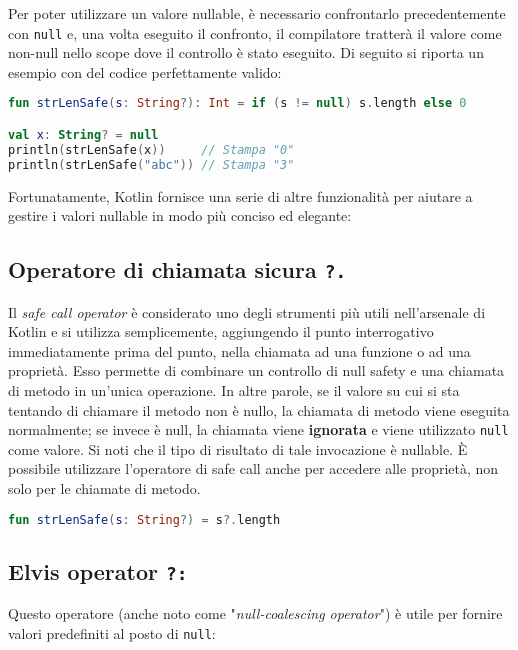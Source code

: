 Per poter utilizzare un valore nullable, è necessario confrontarlo precedentemente con \texttt{null} e, una volta eseguito il confronto, il compilatore tratterà il valore come non-null nello scope dove il controllo è stato eseguito. Di seguito si riporta un esempio con del codice perfettamente valido:\\

\begin{lstlisting}[caption={Aggirare i valori \texttt{null} grazie alla nullability}, captionpos=b, label={lst:exampleNullKtElse}, language=Kotlin]
fun strLenSafe(s: String?): Int = if (s != null) s.length else 0

val x: String? = null
println(strLenSafe(x))     // Stampa "0"
println(strLenSafe("abc")) // Stampa "3"
\end{lstlisting}

Fortunatamente, Kotlin fornisce una serie di altre funzionalità per aiutare a gestire i valori nullable in modo più conciso ed elegante:\\

\subsection{Operatore di chiamata sicura {\bfseries \texttt{?.}}}
Il {\em safe call operator} è considerato uno degli strumenti più utili nell'arsenale di Kotlin e si utilizza semplicemente, aggiungendo il punto interrogativo immediatamente prima del punto, nella chiamata ad una funzione o ad una proprietà. Esso permette di combinare un controllo di null safety e una chiamata di metodo in un'unica operazione. In altre parole, se il valore su cui si sta tentando di chiamare il metodo non è nullo, la chiamata di metodo viene eseguita normalmente; se invece è null, la chiamata viene {\bfseries ignorata} e viene utilizzato \texttt{null} come valore. Si noti che il tipo di risultato di tale invocazione è nullable. È possibile utilizzare l'operatore di safe call anche per accedere alle proprietà, non solo per le chiamate di metodo.\\

\begin{lstlisting}[caption={Utilizzo di safe call operator}, captionpos=b, label={lst:exampleSafeCall}, language=Kotlin]
fun strLenSafe(s: String?) = s?.length
\end{lstlisting}

\subsection{Elvis operator {\bfseries \texttt{?:}}}
Questo operatore (anche noto come "{\em null-coalescing operator}") è utile per fornire valori predefiniti al posto di \texttt{null}:\\

